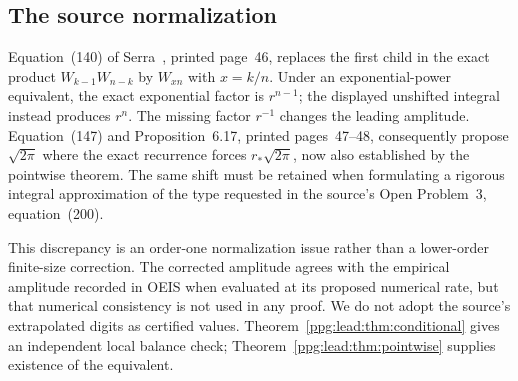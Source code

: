 \documentclass[11pt,letterpaper]{article}
\theoremstyle{remark}\newtheorem{remark}[theorem]{Remark}
\numberwithin{equation}{section}
\begin{document}
\subsection{The source normalization}\label{ppg:lead:sec:sourcecorrection}
Equation~(140) of Serra~\cite{serra}, printed page~46, replaces the first child in the exact product $W_{k-1}W_{n-k}$ by $W_{xn}$ with $x=k/n$. Under an exponential-power equivalent, the exact exponential factor is $r^{n-1}$; the displayed unshifted integral instead produces $r^n$. The missing factor $r^{-1}$ changes the leading amplitude. Equation~(147) and Proposition~6.17, printed pages~47--48, consequently propose $\sqrt{2\pi}$ where the exact recurrence forces $r_*\sqrt{2\pi}$, now also established by the pointwise theorem. The same shift must be retained when formulating a rigorous integral approximation of the type requested in the source's Open Problem~3, equation~(200).

This discrepancy is an order-one normalization issue rather than a lower-order finite-size correction. The corrected amplitude agrees with the empirical amplitude recorded in OEIS when evaluated at its proposed numerical rate, but that numerical consistency is not used in any proof. We do not adopt the source's extrapolated digits as certified values. Theorem~\ref{ppg:lead:thm:conditional} gives an independent local balance check; Theorem~\ref{ppg:lead:thm:pointwise} supplies existence of the equivalent.
\end{document}
